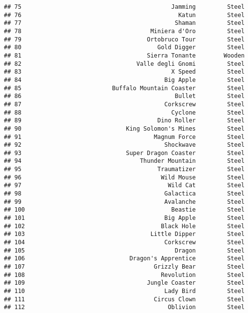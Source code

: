 \documentclass[
]{article}
\begin{document}
\begin{verbatim}
## 75                                           Jamming         Steel
## 76                                             Katun         Steel
## 77                                            Shaman         Steel
## 78                                     Miniera d'Oro         Steel
## 79                                    Ortobruco Tour         Steel
## 80                                       Gold Digger         Steel
## 81                                    Sierra Tonante        Wooden
## 82                                 Valle degli Gnomi         Steel
## 83                                           X Speed         Steel
## 84                                         Big Apple         Steel
## 85                          Buffalo Mountain Coaster         Steel
## 86                                            Bullet         Steel
## 87                                         Corkscrew         Steel
## 88                                           Cyclone         Steel
## 89                                       Dino Roller         Steel
## 90                              King Solomon's Mines         Steel
## 91                                      Magnum Force         Steel
## 92                                         Shockwave         Steel
## 93                              Super Dragon Coaster         Steel
## 94                                  Thunder Mountain         Steel
## 95                                       Traumatizer         Steel
## 96                                        Wild Mouse         Steel
## 97                                          Wild Cat         Steel
## 98                                         Galactica         Steel
## 99                                         Avalanche         Steel
## 100                                          Beastie         Steel
## 101                                        Big Apple         Steel
## 102                                       Black Hole         Steel
## 103                                    Little Dipper         Steel
## 104                                        Corkscrew         Steel
## 105                                           Dragon         Steel
## 106                              Dragon's Apprentice         Steel
## 107                                     Grizzly Bear         Steel
## 108                                       Revolution         Steel
## 109                                   Jungle Coaster         Steel
## 110                                        Lady Bird         Steel
## 111                                     Circus Clown         Steel
## 112                                         Oblivion         Steel

\end{verbatim}
\end{document}
